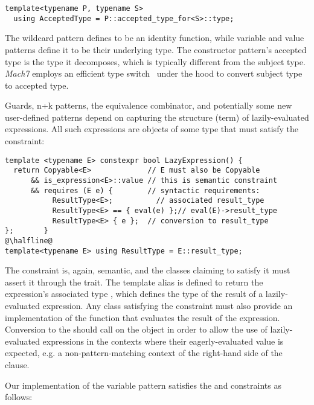 \begin{lstlisting}
template<typename P, typename S>
  using AcceptedType = P::accepted_type_for<S>::type;
\end{lstlisting}

\noindent
The wildcard pattern defines  to be an identity 
function, while variable and value patterns define it to be their underlying 
type. The constructor pattern's accepted type is the type it decomposes, which 
is typically different from the subject type. \emph{Mach7} employs an efficient 
type switch~\cite{TS12} under the hood to convert subject type to accepted type. 

Guards, n+k patterns, the equivalence combinator, and potentially some 
new user-defined patterns depend on capturing the structure (term) of lazily-evaluated expressions.
All such expressions are objects of some type  
that must satisfy the  constraint:

\begin{lstlisting}[keepspaces]
template <typename E> constexpr bool LazyExpression() {
  return Copyable<E>             // E must also be Copyable
      && is_expression<E>::value // this is semantic constraint
      && requires (E e) {        // syntactic requirements:
           ResultType<E>;          // associated result_type
           ResultType<E> == { eval(e) };// eval(E)->result_type
           ResultType<E> { e };  // conversion to result_type
};       }
@\halfline@
template<typename E> using ResultType = E::result_type;
\end{lstlisting}

\noindent
The constraint is, again, semantic, and the classes claiming to satisfy it must 
assert it through the  trait. The template alias  
is defined to return the expression's associated type , which 
defines the type of the result of a lazily-evaluated expression. Any class 
satisfying the  constraint must also provide an implementation 
of the function  that evaluates the result of the expression. Conversion 
to the  should call  on the object in order to 
allow the use of lazily-evaluated expressions in the contexts where their 
eagerly-evaluated value is expected, e.g. a non-pattern-matching context of the 
right-hand side of the  clause. 

Our implementation of the variable pattern  satisfies the 
 and  constraints as follows:

